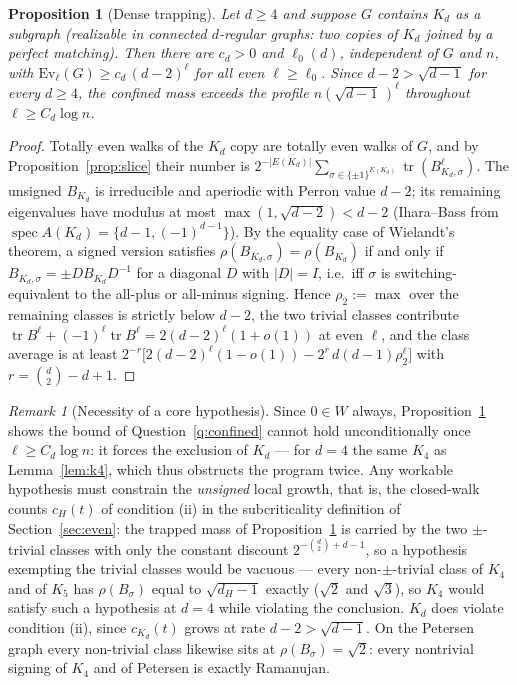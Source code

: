\documentclass[11pt]{article}
\newtheorem{proposition}[lemma]{Proposition}
\theoremstyle{remark}
\newtheorem{remark}[lemma]{Remark}
\DeclareMathOperator{\tr}{tr}
\begin{document}
\begin{proposition}[Dense trapping]\label{prop:trap}
Let $d\ge4$ and suppose $G$ contains $K_d$ as a subgraph (realizable in
connected $d$-regular graphs: two copies of $K_d$ joined by a perfect
matching). Then there are $c_d>0$ and $\ell_0(d)$, independent of $G$
and $n$, with $\mathrm{Ev}_\ell(G)\ge c_d\,(d-2)^{\ell}$ for all even
$\ell\ge\ell_0$. Since $d-2>\sqrt{d-1}$ for every $d\ge4$, the confined
mass exceeds the profile $n(\sqrt{d-1}\,)^{\ell}$ throughout
$\ell\ge C_d\log n$.
\end{proposition}

\begin{proof}
Totally even walks of the $K_d$ copy are totally even walks of $G$, and
by Proposition~\ref{prop:slice} their number is
$2^{-|E(K_d)|}\sum_{\sigma\in\{\pm1\}^{E(K_d)}}\tr(B_{K_d,\sigma}^\ell)$.
The unsigned $B_{K_d}$ is irreducible and aperiodic with Perron value
$d-2$; its remaining eigenvalues have modulus at most
$\max(1,\sqrt{d-2})<d-2$ (Ihara--Bass from
$\operatorname{spec}A(K_d)=\{d-1,(-1)^{d-1}\}$). By the equality case of
Wielandt's theorem, a signed version satisfies
$\rho(B_{K_d,\sigma})=\rho(B_{K_d})$ if and only if
$B_{K_d,\sigma}=\pm D B_{K_d}D^{-1}$ for a diagonal $D$ with
$|D|=I$, i.e.\ iff $\sigma$ is switching-equivalent to the all-plus or
all-minus signing. Hence $\rho_2:=\max$ over the remaining classes is
strictly below $d-2$, the two trivial classes contribute
$\tr B^\ell+(-1)^\ell\tr B^\ell=2(d-2)^\ell(1+o(1))$ at even $\ell$, and
the class average is at least
$2^{-r}\big[2(d-2)^\ell(1-o(1))-2^{r}\,d(d-1)\rho_2^{\ell}\big]$ with
$r=\binom d2-d+1$.
\end{proof}

\begin{remark}[Necessity of a core hypothesis]\label{rem:core}
Since $0\in W$ always, Proposition~\ref{prop:trap} shows the bound of
Question~\ref{q:confined} cannot hold unconditionally once
$\ell\ge C_d\log n$: it forces the exclusion of $K_d$ --- for $d=4$
the same $K_4$ as Lemma~\ref{lem:k4}, which thus obstructs the program
twice. Any workable hypothesis must constrain the \emph{unsigned}
local growth, that is, the closed-walk counts $c_H(t)$ of condition
(ii) in the subcriticality definition of Section~\ref{sec:even}: the
trapped mass of Proposition~\ref{prop:trap} is carried by the two
$\pm$-trivial classes with only the constant discount
$2^{-\binom d2+d-1}$, so a hypothesis exempting the trivial classes
would be vacuous --- every non-$\pm$-trivial class of $K_4$ and of
$K_5$ has $\rho(B_\sigma)$ equal to $\sqrt{d_H-1}$ exactly ($\sqrt2$
and $\sqrt3$), so $K_4$ would satisfy such a hypothesis at $d=4$ while
violating the conclusion. $K_d$ does violate condition (ii), since
$c_{K_d}(t)$ grows at rate $d-2>\sqrt{d-1}$. On the Petersen graph
every non-trivial class likewise sits at $\rho(B_\sigma)=\sqrt2$:
every nontrivial signing of $K_4$ and of Petersen is exactly
Ramanujan.
\end{remark}
\end{document}
